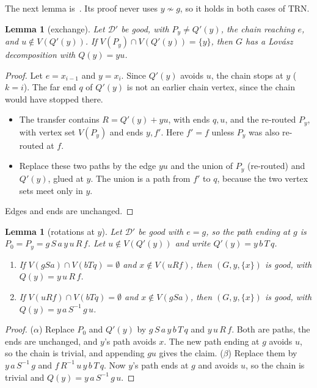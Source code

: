 \documentclass[11pt]{amsart}
\newtheorem{lemma}[theorem]{Lemma}
\theoremstyle{definition}
\newcommand{\cD}{\mathcal D}
\newcommand{\TRN}{\mathrm{TRN}}
\begin{document}
The next lemma is~\cite[Lemma~4.2]{L1I}. Its proof never uses $y\not\sim g$, so it holds in both
cases of $\TRN$.

\begin{lemma}[exchange]\label{lem:exchange}
Let $\cD'$ be good, with $P_y\ne Q'(y)$, the chain reaching $e$, and $u\notin V(Q'(y))$. If
$V(P_y)\cap V(Q'(y))=\{y\}$, then $G$ has a Lov\'asz decomposition with $Q(y)=yu$.
\end{lemma}

\begin{proof}
Let $e=x_{i-1}$ and $y=x_i$. Since $Q'(y)$ avoids $u$, the chain stops at $y$ ($k=i$). The far end
$q$ of $Q'(y)$ is not an earlier chain vertex, since the chain would have stopped there.
\begin{itemize}
\item The transfer contains $R=Q'(y)+yu$, with ends $q,u$, and the re-routed $P_y$, with vertex
set $V(P_y)$ and ends $y,f'$. Here $f'=f$ unless $P_y$ was also re-routed at $f$.
\item Replace these two paths by the edge $yu$ and the union of $P_y$ (re-routed) and $Q'(y)$,
glued at $y$. The union is a path from $f'$ to $q$, because the two vertex sets meet only in $y$.
\end{itemize}
Edges and ends are unchanged.
\end{proof}

\begin{lemma}[rotations at $y$]\label{lem:rot}
Let $\cD'$ be good with $e=g$, so the path ending at $g$ is $P_0=P_y=g\,S\,a\,y\,u\,R\,f$. Let
$u\notin V(Q'(y))$ and write $Q'(y)=y\,b\,T\,q$.
\begin{enumerate}[label=(\alpha*)]
\item[($\alpha$)] If $V(gSa)\cap V(bTq)=\emptyset$ and $x\notin V(uRf)$, then $(G,y,\{x\})$ is good,
with $Q(y)=y\,u\,R\,f$.
\item[($\beta$)] If $V(uRf)\cap V(bTq)=\emptyset$ and $x\notin V(gSa)$, then $(G,y,\{x\})$ is good,
with $Q(y)=y\,a\,S^{-1}\,g\,u$.
\end{enumerate}
\end{lemma}

\begin{proof}
($\alpha$) Replace $P_0$ and $Q'(y)$ by $g\,S\,a\,y\,b\,T\,q$ and $y\,u\,R\,f$. Both are paths, the
ends are unchanged, and $y$'s path avoids $x$. The new path ending at $g$ avoids $u$, so the chain
is trivial, and appending $gu$ gives the claim.
($\beta$) Replace them by $y\,a\,S^{-1}\,g$ and $f\,R^{-1}\,u\,y\,b\,T\,q$. Now $y$'s path ends at
$g$ and avoids $u$, so the chain is trivial and $Q(y)=y\,a\,S^{-1}\,g\,u$.
\end{proof}
\end{document}
